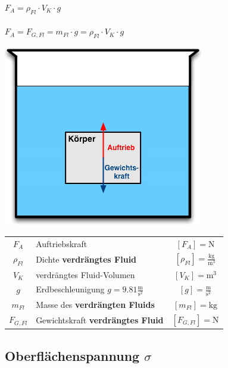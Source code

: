 \begin{minipage}{0.6\linewidth}
$ \boxed{ F_A = \rho_{Fl} \cdot V_K \cdot  g} $ \\
\\
$\boxed{ F_A = F_{G,Fl} = m_{Fl} \cdot g = \rho_{Fl} \cdot V_K \cdot g } $ \\

\end{minipage}
\hfill
\begin{minipage}{0.35\linewidth}
\includegraphics[width=0.75\linewidth]{Bilder/auftrieb} \\
\end{minipage}




	\begin{tabular}{c l c}
		$F_A$ & Auftriebskraft & $[F_A] = \mathrm{N}$ \\
		\rule{0pt}{8pt}$\rho_{Fl}$ & Dichte \textbf{verdrängtes Fluid} & $[\rho_{Fl}] = \mathrm{\frac{kg}{m^3}}$ \\
		$V_K$ & verdrängtes Fluid-Volumen & $[V_K] = \mathrm{m^3}$  \\
		\rule{0pt}{8pt}$g$ & Erdbeschleunigung $g = 9.81 \mathrm{\frac{m}{s^2}}$ & $[g] = \mathrm{\frac{m}{s^2}}$ \\
		$m_{Fl}$ & Masse des \textbf{verdrängten Fluids} & $[m_{Fl}] = \mathrm{kg}$ \\
		$F_{G,Fl}$ & Gewichtskraft \textbf{verdrängtes Fluid} & $[F_{G,Fl}] = \mathrm{N}$ \\
	\end{tabular}
	


\subsection{Oberflächenspannung $\sigma$}

